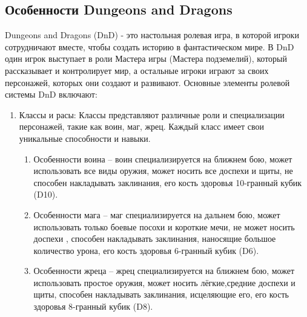 \subsection{Особенности Dungeons and Dragons}
Dungeons and Dragons (DnD) - это настольная ролевая игра, в которой игроки сотрудничают вместе, чтобы создать историю в фантастическом мире. В DnD один игрок выступает в роли Мастера игры (Мастера подземелий), который рассказывает и контролирует мир, а остальные игроки играют за своих персонажей, которых они создают и развивают.
Основные элементы ролевой системы DnD включают:
	\begin{enumerate} 
		\item Классы и расы: Классы представляют различные роли и специализации персонажей, такие как воин, маг, жрец. Каждый класс имеет свои уникальные способности и навыки.
			\begin{enumerate}
				\item Особенности воина -- воин специализируется на ближнем бою, может использовать все виды оружия, может носить все доспехи и щиты, не способен накладывать заклинания, его кость здоровья 10-гранный кубик (D10).
				\item Особенности мага -- маг специализируется на дальнем бою, может использовать только боевые посохи и короткие мечи, не может носить доспехи , способен накладывать заклинания, наносящие большое количество урона, его кость здоровья 6-гранный кубик (D6).
				\item Особенности жреца -- жрец специализируется на ближнем бою, может использовать простое оружия, может носить лёгкие,средние доспехи и щиты, способен накладывать заклинания, исцеляющие его, его кость здоровья 8-гранный кубик (D8).
			\end{enumerate}


\end{enumerate}
